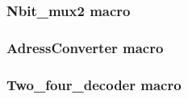 \documentclass[a4paper]{article}
\begin{document}
\subsubsection{Nbit\_mux2 macro}


\subsubsection{AdressConverter macro}


\subsubsection{Two\_four\_decoder macro}




%
%
\end{document}
